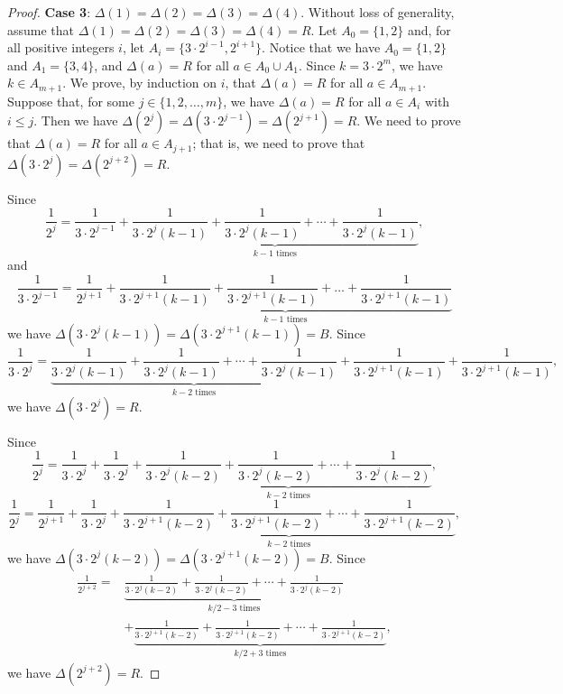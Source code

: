 \documentclass[10pt,a4paper]{amsart}
\begin{document}
\begin{proof}
\textbf{Case 3}: $\Delta(1)=\Delta(2)=\Delta(3)=\Delta(4)$. Without loss of generality, assume that $\Delta(1)=\Delta(2)=\Delta(3)=\Delta(4)=R$. Let $A_0=\{1,2\}$ and, for all positive integers $i$, let $A_i=\{3\cdot2^{i-1},2^{i+1}\}$. Notice that we have $A_0=\{1,2\}$ and $A_1=\{3,4\}$, and $\Delta(a)=R$ for all $a\in A_0\cup A_1$. Since $k=3\cdot2^m$, we have $k\in A_{m+1}$. We prove, by induction on $i$, that $\Delta(a)=R$ for all $a\in A_{m+1}$. Suppose that, for some $j\in\{1,2,\ldots,m\}$, we have $\Delta(a)=R$ for all $a\in A_i$ with $i\leq j$. Then we have $\Delta(2^j)=\Delta(3\cdot2^{j-1})=\Delta(2^{j+1})=R$. We need to prove that $\Delta(a)=R$ for all $a\in A_{j+1}$; that is, we need to prove that $\Delta(3\cdot2^j)=\Delta(2^{j+2})=R$.

Since
\begin{equation}\label{Identity:1}
    \frac{1}{2^j}=\frac{1}{3\cdot2^{j-1}}+\underbrace{\frac{1}{3\cdot2^{j}(k-1)}+\frac{1}{3\cdot2^{j}(k-1)}+\cdots+\frac{1}{3\cdot2^{j}(k-1)}}_{k-1\text{ times}},
\end{equation}
and
\begin{equation}\label{Identity:2}
    \frac{1}{3\cdot2^{j-1}}=\frac{1}{2^{j+1}}+\underbrace{\frac{1}{3\cdot2^{j+1}(k-1)}+\frac{1}{3\cdot2^{j+1}(k-1)}+\ldots+\frac{1}{3\cdot2^{j+1}(k-1)}}_{k-1\text{ times}}
\end{equation}
we have $\Delta(3\cdot2^{j}(k-1))=\Delta(3\cdot2^{j+1}(k-1))=B$. Since
\begin{equation}\label{Identity:3}
    \frac{1}{3\cdot2^j}=\underbrace{\frac{1}{3\cdot2^j(k-1)}+\frac{1}{3\cdot2^j(k-1)}+\cdots+\frac{1}{3\cdot2^j(k-1)}}_{k-2\text{ times}}+\frac{1}{3\cdot2^{j+1}(k-1)}+\frac{1}{3\cdot2^{j+1}(k-1)},
\end{equation}
we have $\Delta(3\cdot2^j)=R$. 

Since
\begin{equation}\label{Identity:4}
\frac{1}{2^j}=\frac{1}{3\cdot2^{j}}+\frac{1}{3\cdot2^{j}}+\underbrace{\frac{1}{3\cdot2^{j}(k-2)}+\frac{1}{3\cdot2^{j}(k-2)}+\cdots+\frac{1}{3\cdot2^{j}(k-2)}}_{k-2\text{ times}},
\end{equation}
\begin{equation}\label{Identity:5}
    \frac{1}{2^{j}}=\frac{1}{2^{j+1}}+\frac{1}{3\cdot2^{j}}+\underbrace{\frac{1}{3\cdot2^{j+1}(k-2)}+\frac{1}{3\cdot2^{j+1}(k-2)}+\cdots+\frac{1}{3\cdot2^{j+1}(k-2)}}_{k-2\text{ times}},
\end{equation}
we have $\Delta(3\cdot2^{j}(k-2))=\Delta(3\cdot2^{j+1}(k-2))=B$. Since
\begin{equation}\label{Identity:6}
    \begin{split}
    \frac{1}{2^{j+2}}=&\underbrace{\frac{1}{3\cdot2^{j}(k-2)}+\frac{1}{3\cdot2^{j}(k-2)}+\cdots+\frac{1}{3\cdot2^{j}(k-2)}}_{k/2-3\text{ times}}\\&+\underbrace{\frac{1}{3\cdot2^{j+1}(k-2)}+\frac{1}{3\cdot2^{j+1}(k-2)}+\cdots+\frac{1}{3\cdot2^{j+1}(k-2)}}_{k/2+3\text{ times}},
\end{split}
\end{equation}
we have $\Delta(2^{j+2})=R$.


\end{proof}
\end{document}
